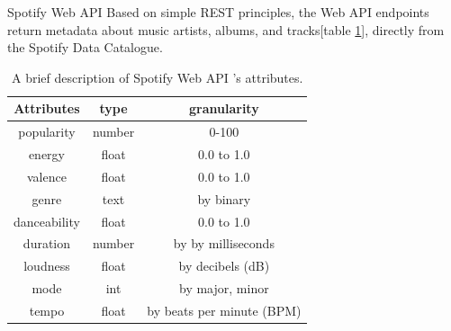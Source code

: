 \documentclass[12pt]{article}
\begin{document}
Spotify Web API \cite{spotify} Based on simple REST principles, the Web API endpoints return metadata about music artists, albums, and tracks[table \ref{table:2}], directly from the Spotify Data Catalogue.
\begin{table}[h!]
\begin{center}
 \begin{tabular}{||c c c ||} 
 \hline
 Attributes & type & granularity \\ [0.5ex] 
 \hline\hline
 popularity & number & 0-100 \\ 
 \hline
 energy & float & 0.0 to 1.0  \\
 \hline
  valence & float & 0.0 to 1.0  \\
 \hline
 genre & text & by binary  \\
 \hline
 danceability & float & 0.0 to 1.0  \\
 \hline
 duration & number & by by milliseconds  \\
 \hline
 loudness & float & by decibels (dB) \\
 \hline
 mode & int & by major, minor \\
  \hline
 tempo & float & by beats per minute (BPM)\\
 \hline
\end{tabular}
\caption{A brief description of Spotify Web API 's attributes.}
\label{table:2}
\end{center}
\end{table}


\newpage
\end{document}
